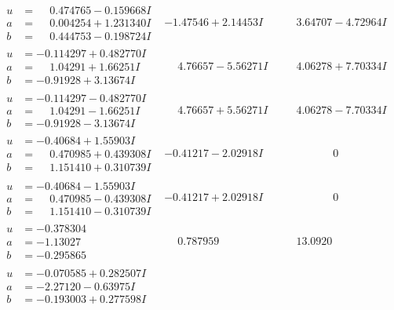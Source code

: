 \documentclass[1p]{elsarticle_modified}
\theoremstyle{definition}
\begin{document}
$$\begin{array}{c|c|c}
\begin{aligned}
u &= \phantom{-}0.474765 - 0.159668 I \\
a &= \phantom{-}0.004254 + 1.231340 I \\
b &= \phantom{-}0.444753 - 0.198724 I\end{aligned}
 & -1.47546 + 2.14453 I & \phantom{-}3.64707 - 4.72964 I \\ \hline\begin{aligned}
u &= -0.114297 + 0.482770 I \\
a &= \phantom{-}1.04291 + 1.66251 I \\
b &= -0.91928 + 3.13674 I\end{aligned}
 & \phantom{-}4.76657 - 5.56271 I & \phantom{-}4.06278 + 7.70334 I \\ \hline\begin{aligned}
u &= -0.114297 - 0.482770 I \\
a &= \phantom{-}1.04291 - 1.66251 I \\
b &= -0.91928 - 3.13674 I\end{aligned}
 & \phantom{-}4.76657 + 5.56271 I & \phantom{-}4.06278 - 7.70334 I \\ \hline\begin{aligned}
u &= -0.40684 + 1.55903 I \\
a &= \phantom{-}0.470985 + 0.439308 I \\
b &= \phantom{-}1.151410 + 0.310739 I\end{aligned}
 & -0.41217 - 2.02918 I & \phantom{-0.000000 } 0 \\ \hline\begin{aligned}
u &= -0.40684 - 1.55903 I \\
a &= \phantom{-}0.470985 - 0.439308 I \\
b &= \phantom{-}1.151410 - 0.310739 I\end{aligned}
 & -0.41217 + 2.02918 I & \phantom{-0.000000 } 0 \\ \hline\begin{aligned}
u &= -0.378304\phantom{ +0.000000I} \\
a &= -1.13027\phantom{ +0.000000I} \\
b &= -0.295865\phantom{ +0.000000I}\end{aligned}
 & \phantom{-}0.787959\phantom{ +0.000000I} & \phantom{-}13.0920\phantom{ +0.000000I} \\ \hline\begin{aligned}
u &= -0.070585 + 0.282507 I \\
a &= -2.27120 - 0.63975 I \\
b &= -0.193003 + 0.277598 I\end{aligned}

\end{array}$$
\end{document}
